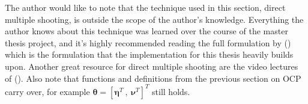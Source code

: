 The author would like to note that the technique used in this section, direct multiple shooting, is outside the scope of the author's knowledge.
Everything the author knows about this technique was learned over the course of the master thesis project, and it's highly recommended reading the full formulation by (\cite{breivik2017mpc})
which is the formulation that the implementation for this thesis heavily builds upon. Another great resource for direct multiple shooting are the video lectures of (\cite{gros2017Lecture}).
Also note that functions and definitions from the previous section on \gls{OCP} carry over, for example $\bm{\theta} = [\bm{\eta}^T \ , \ \bm{\nu}^T]^T$ still holds.

